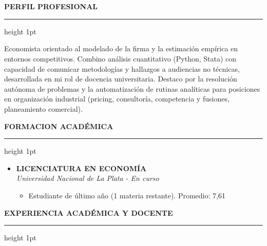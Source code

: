 \documentclass[11pt, a4paper]{article}
\begin{document}
\section*{}
{\Large \bfseries \faUser\hspace{0.4em} PERFIL PROFESIONAL}
\vspace{0.4em}
\hrule height 1pt \color{linecolor}
\vspace{1em}

{\large \color{darktext}
Economista orientado al modelado de la firma y la estimación empírica en entornos competitivos. Combino análisis cuantitativo (Python, Stata) con capacidad de comunicar metodologías y hallazgos a audiencias no técnicas, desarrollada en mi rol de docencia universitaria. Destaco por la resolución autónoma de problemas y la automatización de rutinas analíticas para posiciones en organización industrial (pricing, consultoría, competencia y fusiones, planeamiento comercial).
}

\vspace{1.8em}

{\Large \color{darktext} \bfseries \faGraduationCap\hspace{0.5em} FORMACION ACADÉMICA}
\vspace{0.4em}
\hrule height 1pt \color{linecolor}
\vspace{0.2em}

\begin{itemize}[label=\small$\bullet$, leftmargin=1.4em, itemsep=0.8em]
\color{darktext}
    \item {\large \textbf{LICENCIATURA EN ECONOMÍA}}\\
    {\color{subtext}\textit{Universidad Nacional de La Plata - En curso}}
    \begin{itemize}[label=\tiny$\bullet$]
        \item {\large \color{subtext} Estudiante de último año (1 materia restante). Promedio: 7,61}
    \end{itemize}

\end{itemize}

\vspace{1.0em}


{\Large \color{darktext} \bfseries \faGraduationCap\hspace{0.5em} EXPERIENCIA ACADÉMICA Y DOCENTE}
\vspace{0.4em}
\hrule height 1pt \color{linecolor}
\vspace{0.2em}
\end{document}
